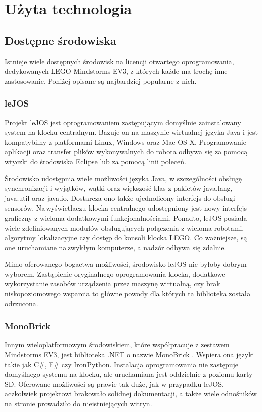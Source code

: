 \section{Użyta technologia}

\subsection{Dostępne środowiska}

Istnieje wiele dostępnych środowisk na licencji otwartego oprogramowania, dedykowanych LEGO Mindstorms EV3, z których każde ma trochę inne zastosowanie. Poniżej opisane są najbardziej popularne z nich.

\subsubsection{leJOS}

Projekt leJOS \cite{lejos} jest oprogramowaniem zastępującym domyślnie zainstalowany system na klocku centralnym. Bazuje on na maszynie wirtualnej języka Java i jest kompatybilny z platformami Linux, Windows oraz Mac OS X. Programowanie aplikacji oraz transfer plików wykonywalnych do robota odbywa się za pomocą wtyczki do środowiska Eclipse lub za pomocą linii poleceń.

Środowisko udostępnia wiele możliwości języka Java, w szczególności obsługę synchronizacji i wyjątków, wątki oraz większość klas z pakietów java.lang, java.util oraz java.io. Dostarcza ono także ujednolicony interfejs do obsługi sensorów. Na\,wyświetlaczu klocka centralnego udostępniony jest nowy interfejs graficzny z wieloma dodatkowymi funkcjonalnościami. Ponadto, leJOS posiada wiele zdefiniowanych modułów obsługujących połączenia z wieloma robotami, algorytmy lokalizacyjne czy dostęp do konsoli klocka LEGO. Co ważniejsze, są one uruchamiane na\,zwykłym komputerze, a nadzór odbywa się zdalnie.

Mimo oferowanego bogactwa możliwości, środowisko leJOS nie byłoby dobrym wyborem. Zastąpienie oryginalnego oprogramowania klocka, dodatkowe wykorzystanie zasobów urządzenia przez maszynę wirtualną, czy brak niskopoziomowego wsparcia to główne powody dla których ta biblioteka została odrzucona.

\subsubsection{MonoBrick}

Innym wieloplatformowym środowiskiem, które współpracuje z zestawem Mindstorms EV3, jest biblioteka .NET o nazwie MonoBrick \cite{monobrick}. Wspiera ona języki takie jak C\#, F\# czy IronPython. Instalacja oprogramowania nie zastępuje domyślnego systemu na klocku, ale uruchamiana jest oddzielnie z poziomu karty SD. Oferowane możliwości są prawie tak duże, jak w przypadku leJOS, aczkolwiek projektowi brakowało solidnej dokumentacji, a także wiele odnośników na stronie prowadziło do nieistniejących witryn.

